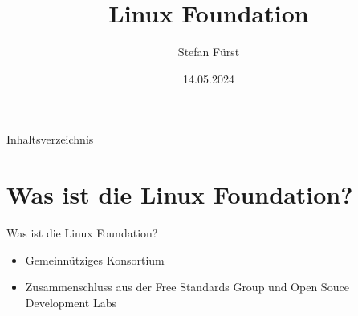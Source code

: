\documentclass[11pt,aspectratio=169]{beamer}
\title {Linux Foundation}
\author{Stefan Fürst}
\date{14.05.2024}
\begin{document}
\begin{frame}
	\maketitle
\end{frame}

\begin{frame}{Inhaltsverzeichnis}
	\tableofcontents
\end{frame}
\section{Was ist die Linux Foundation?}
\begin{frame}{Was ist die Linux Foundation?}
	\begin{itemize}
		\item Gemeinnütziges Konsortium \cite{NPO}
		\item Zusammenschluss aus der Free Standards Group und Open Souce Development Labs\cite{Zusamenschluss}
	\end{itemize}
\end{frame}
\end{document}

